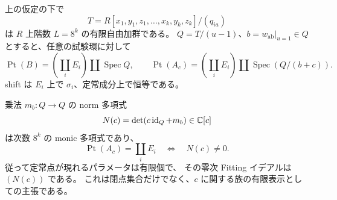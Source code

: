 \begin{theorem}[一中心変数での定常点の有限判定]
\label{cmo:thm:point-norm}
上の仮定の下で
\[
 T=R[x_1,y_1,z_1,\ldots,x_k,y_k,z_k]/(q_{ia})
\]
は $R$ 上階数 $L=8^k$ の有限自由加群である。
$Q=T/(u-1)$、$b=w_{\mathrm{ab}}|_{u=1}\in Q$ とすると、任意の試験環に対して
\begin{equation}\label{cmo:eq:point-scheme}
 \operatorname{Pt}(B)=\left(\coprod_i E_i\right)\amalg\operatorname{Spec}Q,
 \qquad
 \operatorname{Pt}(A_c)=\left(\coprod_i E_i\right)
                  \amalg\operatorname{Spec}(Q/(b+c)).
\end{equation}
shift は $E_i$ 上で $\sigma_i$、定常成分上で恒等である。

乗法 $m_b:Q\to Q$ の norm 多項式
\begin{equation}\label{cmo:eq:norm}
 N(c)=\det(c\operatorname{id}_Q+m_b)\in\mathbb C[c]
\end{equation}
は次数 $8^k$ の monic 多項式であり、
\[
 \operatorname{Pt}(A_c)=\coprod_iE_i
 \quad\Longleftrightarrow\quad N(c)\ne0.
\]
従って定常点が現れるパラメータは有限個で、
その零次 Fitting イデアルは $(N(c))$ である。
これは閉点集合だけでなく、$c$ に関する族の有限表示としての主張である。
\end{theorem}

